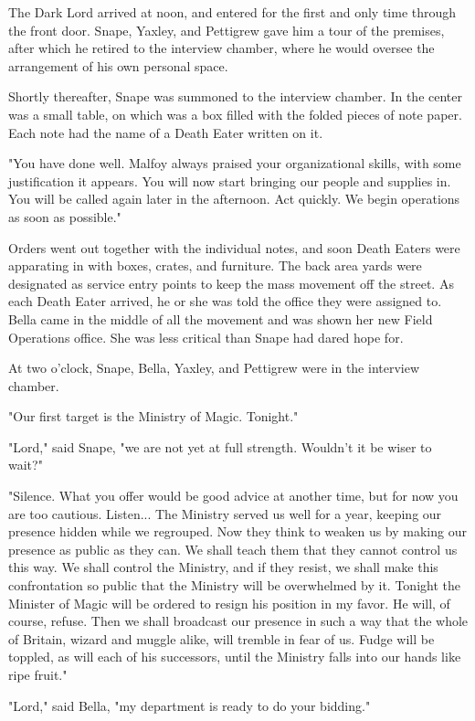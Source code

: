 \documentclass[a4paper,11pt]{article}
\begin{document}
The Dark Lord arrived at noon, and entered for the first and only time through the front door. Snape, Yaxley, and Pettigrew gave him a tour of the premises, after which he retired to the interview chamber, where he would oversee the arrangement of his own personal space.

Shortly thereafter, Snape was summoned to the interview chamber. In the center was a small table, on which was a box filled with the folded pieces of note paper. Each note had the name of a Death Eater written on it.

"You have done well. Malfoy always praised your organizational skills, with some justification it appears. You will now start bringing our people and supplies in. You will be called again later in the afternoon. Act quickly. We begin operations as soon as possible."

Orders went out together with the individual notes, and soon Death Eaters were apparating in with boxes, crates, and furniture. The back area yards were designated as service entry points to keep the mass movement off the street. As each Death Eater arrived, he or she was told the office they were assigned to. Bella came in the middle of all the movement and was shown her new Field Operations office. She was less critical than Snape had dared hope for.

At two o'clock, Snape, Bella, Yaxley, and Pettigrew were in the interview chamber.

"Our first target is the Ministry of Magic. Tonight."

"Lord," said Snape, "we are not yet at full strength. Wouldn't it be wiser to wait?"

"Silence. What you offer would be good advice at another time, but for now you are too cautious. Listen... The Ministry served us well for a year, keeping our presence hidden while we regrouped. Now they think to weaken us by making our presence as public as they can. We shall teach them that they cannot control us this way. We shall control the Ministry, and if they resist, we shall make this confrontation so public that the Ministry will be overwhelmed by it. Tonight the Minister of Magic will be ordered to resign his position in my favor. He will, of course, refuse. Then we shall broadcast our presence in such a way that the whole of Britain, wizard and muggle alike, will tremble in fear of us. Fudge will be toppled, as will each of his successors, until the Ministry falls into our hands like ripe fruit."

"Lord," said Bella, "my department is ready to do your bidding."
\end{document}
